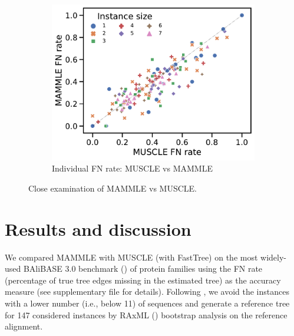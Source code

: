 \begin{figure}[!htbp]
\begin{adjustwidth}{-1.1cm}{}
		\begin{subfigure}{0.35\textwidth} \includegraphics[width=\textwidth]{Figure/delta5} \caption{Individual FN rate: MUSCLE vs MAMMLE}\end{subfigure}
	\end{adjustwidth}
	\caption{Close examination of MAMMLE vs MUSCLE.}
	\label{fig:PMAO}
\end{figure}

\section{Results and discussion }
We compared MAMMLE with MUSCLE (with FastTree) on the most widely-used BAliBASE 3.0 benchmark (\cite{thompson2005balibase}) of protein families using the FN rate (percentage of true tree edges missing in the estimated tree) as the accuracy measure (see supplementary file for details). Following \cite{mirarab2015pasta}, we avoid the instances with a lower number (i.e., below 11) of sequences and generate a reference tree for 147 considered instances by RAxML (\cite{stamatakis2014raxml}) bootstrap analysis on the reference alignment.

